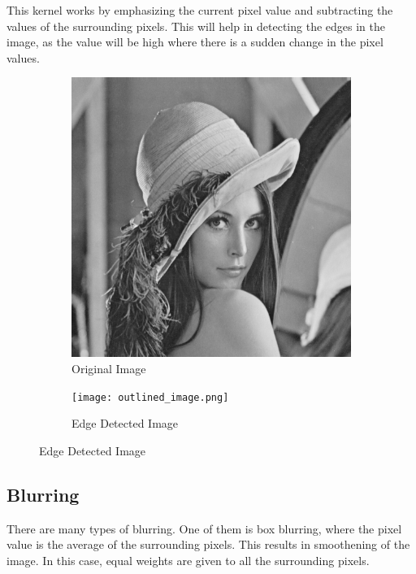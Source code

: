 \documentclass[12pt]{report}
\begin{document}
This kernel works by emphasizing the current pixel value and subtracting the values of the surrounding pixels. This will help in detecting the edges in the image, as the value will be high where there is a sudden change in the pixel values.

\begin{figure}[H]
    \centering
    \begin{subfigure}{0.4\textwidth}
        \centering
        \includegraphics[width=\linewidth]{Lena.png}
        \caption{Original Image}
    \end{subfigure}
    \begin{subfigure}{0.4\textwidth}
        \centering
        \texttt{[image: outlined\_image.png]}
        \caption{Edge Detected Image}
    \end{subfigure}
\end{figure}

\subsection{Blurring}

There are many types of blurring. One of them is box blurring, where the pixel value is the average of the surrounding pixels. This results in smoothening of the image. In this case, equal weights are given to all the surrounding pixels.
\end{document}
